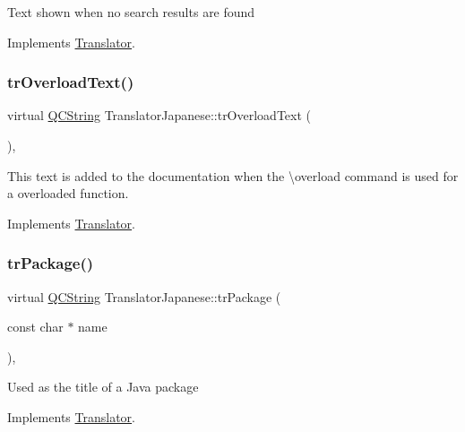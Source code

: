 Text shown when no search results are found 

Implements \mbox{\hyperlink{class_translator}{Translator}}.

\mbox{\label{class_translator_japanese_a2b504f1eeebf18f26ed6c6696432e178}} 
\subsubsection{\texorpdfstring{trOverloadText()}{trOverloadText()}}
{\footnotesize\ttfamily virtual \mbox{\hyperlink{class_q_c_string}{Q\+C\+String}} Translator\+Japanese\+::tr\+Overload\+Text (\begin{DoxyParamCaption}{ }\end{DoxyParamCaption})\hspace{0.3cm}{\ttfamily [inline]}, {\ttfamily [virtual]}}

This text is added to the documentation when the \textbackslash{}overload command is used for a overloaded function. 

Implements \mbox{\hyperlink{class_translator}{Translator}}.

\mbox{\label{class_translator_japanese_afd3280d43c7c68278671b3084b05bf72}} 
\subsubsection{\texorpdfstring{trPackage()}{trPackage()}}
{\footnotesize\ttfamily virtual \mbox{\hyperlink{class_q_c_string}{Q\+C\+String}} Translator\+Japanese\+::tr\+Package (\begin{DoxyParamCaption}\item[{const char $\ast$}]{name }\end{DoxyParamCaption})\hspace{0.3cm}{\ttfamily [inline]}, {\ttfamily [virtual]}}

Used as the title of a Java package 

Implements \mbox{\hyperlink{class_translator}{Translator}}.

\mbox{\label{class_translator_japanese_a001f6707a68e0a6b3584992448c01da2}} 
